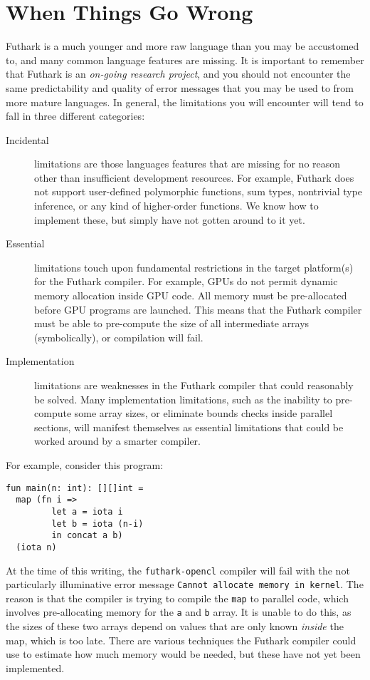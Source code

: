 \documentclass[11pt]{book}
\begin{document}
\section{When Things Go Wrong}

Futhark is a much younger and more raw language than you may be
accustomed to, and many common language features are missing.  It is
important to remember that Futhark is an \textit{on-going research
  project}, and you should not encounter the same predictability and
quality of error messages that you may be used to from more mature
languages.  In general, the limitations you will encounter will tend
to fall in three different categories:

\begin{description}
\item[Incidental] limitations are those languages features that are
  missing for no reason other than insufficient development resources.
  For example, Futhark does not support user-defined polymorphic
  functions, sum types, nontrivial type inference, or any kind of
  higher-order functions.  We know how to implement these, but simply
  have not gotten around to it yet.

\item[Essential] limitations touch upon fundamental restrictions in
  the target platform(s) for the Futhark compiler.  For example, GPUs
  do not permit dynamic memory allocation inside GPU code.  All memory
  must be pre-allocated before GPU programs are launched.  This means
  that the Futhark compiler must be able to pre-compute the size of
  all intermediate arrays (symbolically), or compilation will fail.

\item[Implementation] limitations are weaknesses in the Futhark
  compiler that could reasonably be solved.  Many implementation
  limitations, such as the inability to pre-compute some array sizes,
  or eliminate bounds checks inside parallel sections, will manifest
  themselves as essential limitations that could be worked around by a
  smarter compiler.
\end{description}

For example, consider this program:

\begin{lstlisting}
fun main(n: int): [][]int =
  map (fn i =>
         let a = iota i
         let b = iota (n-i)
         in concat a b)
  (iota n)
\end{lstlisting}

At the time of this writing, the \texttt{futhark-opencl} compiler will
fail with the not particularly illuminative error message
\texttt{Cannot allocate memory in kernel}.  The reason is that the
compiler is trying to compile the \texttt{map} to parallel code, which
involves pre-allocating memory for the \texttt{a} and \texttt{b}
array.  It is unable to do this, as the sizes of these two arrays
depend on values that are only known \textit{inside} the map, which is
too late.  There are various techniques the Futhark compiler could use
to estimate how much memory would be needed, but these have not yet
been implemented.
\end{document}
